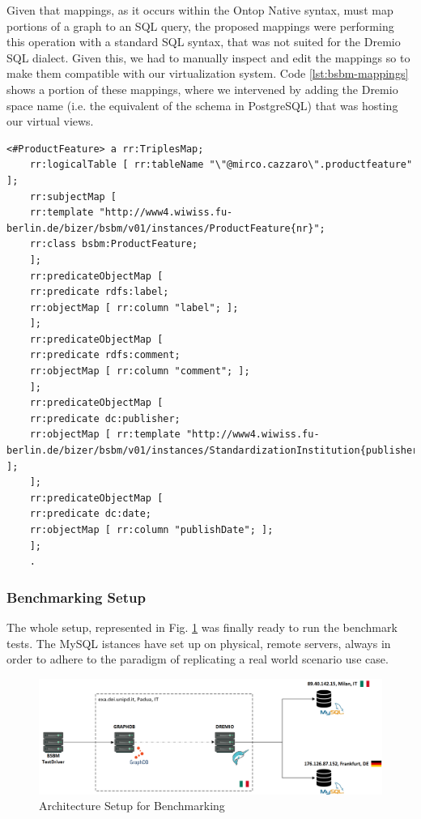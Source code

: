 Given that mappings, as it occurs within the Ontop Native syntax, must map portions of a graph to an SQL query, the proposed mappings were performing this operation with a standard SQL syntax, that was not suited for the Dremio SQL dialect. Given this, we had to manually inspect and edit the mappings so to make them compatible with our virtualization system. Code \ref{lst:bsbm-mappings} shows a portion of these mappings, where we intervened by adding the Dremio space name (i.e. the equivalent of the schema in PostgreSQL) that was hosting our virtual views.
\begin{lstlisting}[language=R2RML, caption={BSBM Custom Mappings for Dremio SQL Syntax i R2RML}, label={lst:bsbm-mappings}]
    <#ProductFeature> a rr:TriplesMap;
    rr:logicalTable [ rr:tableName "\"@mirco.cazzaro\".productfeature" ];
    rr:subjectMap [
    rr:template "http://www4.wiwiss.fu-berlin.de/bizer/bsbm/v01/instances/ProductFeature{nr}";
    rr:class bsbm:ProductFeature;
    ];
    rr:predicateObjectMap [
    rr:predicate rdfs:label;
    rr:objectMap [ rr:column "label"; ];
    ];
    rr:predicateObjectMap [
    rr:predicate rdfs:comment;
    rr:objectMap [ rr:column "comment"; ];
    ];
    rr:predicateObjectMap [
    rr:predicate dc:publisher;
    rr:objectMap [ rr:template "http://www4.wiwiss.fu-berlin.de/bizer/bsbm/v01/instances/StandardizationInstitution{publisher}"; ];
    ];
    rr:predicateObjectMap [
    rr:predicate dc:date;
    rr:objectMap [ rr:column "publishDate"; ];
    ];
    .
\end{lstlisting}

\subsubsection{Benchmarking Setup}
The whole setup, represented in Fig. \ref{fig:benchmark-setup} was finally ready to run the benchmark tests. The MySQL istances have set up on physical, remote servers, always in order to adhere to the paradigm of replicating a real world scenario use case.
\begin{figure}[ht]
    \centering
    \includegraphics[width=16cm]{res/benchmark-setup.png}
    \caption{Architecture Setup for Benchmarking}
    \label{fig:benchmark-setup}
\end{figure}

